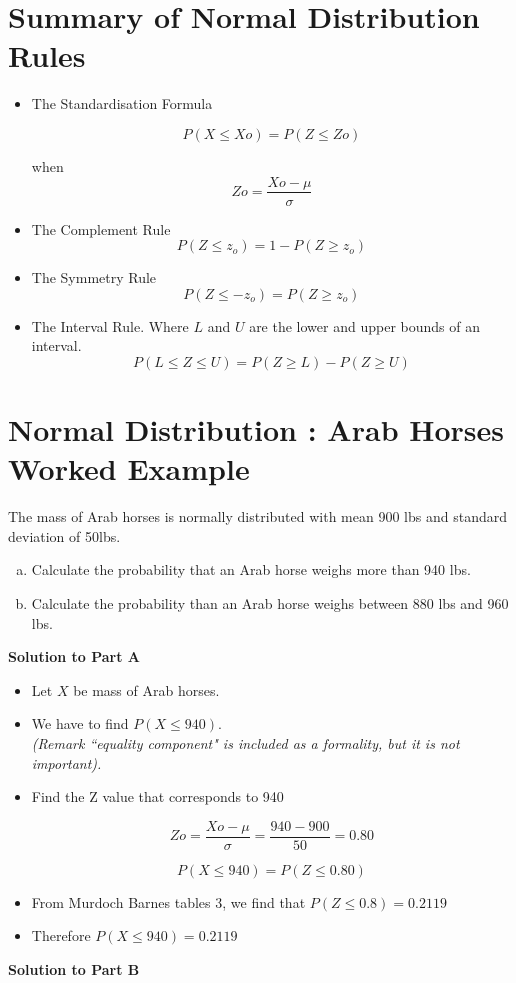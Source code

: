 \documentclass[a4paper,12pt]{article}
\begin{document}
\section*{Summary of Normal Distribution Rules}



\begin{framed}
	\begin{itemize}
			\item The Standardisation Formula
			
			\[P(X \leq Xo) = P(Z \leq Zo)	  \]  
			
			when   \[Zo=\frac{Xo- \mu}{\sigma}\]
		\item The Complement Rule
		\[
		P(Z \leq z_o) = 1 - P(Z \geq z_o)
		\]
		\item The Symmetry Rule
		\[
		P(Z \leq -z_o) = P(Z \geq z_o)
		\]
		\item The Interval Rule.
		Where $L$ and $U$ are the lower and upper bounds of an interval.
		\[
		P(L \leq Z \leq U) = P(Z \geq L) -  P(Z \geq U)
		\]
		
	\end{itemize}
\end{framed}
	
\section*{Normal Distribution : Arab Horses Worked Example}
The mass of Arab horses is normally distributed with mean 900 lbs and standard deviation of 50lbs.
\begin{enumerate}[(a)]
\item  Calculate the probability that an Arab horse weighs more than 940 lbs.
\item Calculate the probability than an Arab horse weighs between 880 lbs and 960 lbs.
\end{enumerate}

\noindent \textbf{Solution to Part A}

\begin{itemize}
	\item Let $X$ be mass of Arab horses.
	
	\item We have to find $P(X\leq940)$.  \\          
	\textit{(Remark ``equality component" is included as a formality, but it is not important).}
	
	
	\item	Find the Z value that corresponds to 940 
	
	\[Zo=\frac{Xo-\mu}{\sigma}= \frac{940 -900}{50}= 0.80\]
	
	\[P(X \leq 940) = P(Z \leq 0.80) \]
	
	
	\item	From Murdoch Barnes tables 3, we find that $P(Z \leq 0.8) = 0.2119$
	
	\item 
	Therefore $P(X \leq 940) = 0.2119$
\end{itemize}
\noindent \textbf{Solution to Part B}
\end{document}
